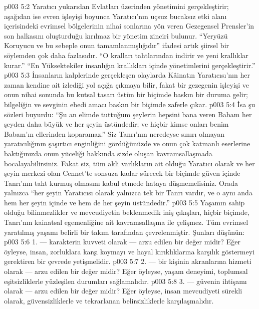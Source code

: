 \vs p003 5:2 Yaratıcı yukarıdan Evlatları üzerinden yönetimini gerçekleştirir; aşağıdan ise evren işleyişi boyunca Yaratıcı’nın uçsuz bucaksız etki alanı içerisindeki evrimsel bölgelerinin nihai sonlarına yön veren Gezegensel Prensler’in son halkasını oluşturduğu kırılmaz bir yönetim zinciri bulunur. “Yeryüzü Koruyucu ve bu sebeple onun tamamlanmışlığıdır” ifadesi artık şiirsel bir söylemden çok daha fazlasıdır. “O kralları tahtlarından indirir ve yeni krallıklar kurar.” “En Yüksektekiler insanlığın krallıkları içinde yönetimlerini gerçekleştirir.”
\vs p003 5:3 İnsanların kalplerinde gerçekleşen olaylarda Kâinatın Yaratıcısı’nın her zaman kendine ait izlediği yol açığa çıkmaya bilir, fakat bir gezegenin işleyişi ve onun nihai sonunda bu kutsal tasarı üstün bir biçimde baskın bir duruma gelir; bilgeliğin ve sevginin ebedi amacı baskın bir biçimde zaferle çıkar.
\vs p003 5:4 İsa şu sözleri buyurdu: “Şu an elimde tuttuğum şeylerin hepsini bana veren Babam her şeyden daha büyük ve her şeyin üstündedir; ve hiçbir kimse onları benim Babam’ın ellerinden koparamaz.” Siz Tanrı’nın neredeyse sınırı olmayan yaratıcılığının şaşırtıcı enginliğini gördüğünüzde ve onun çok katmanlı eserlerine baktığınızda onun yüceliği hakkında sizde oluşan kavramsallaşmada bocalayabilirsiniz. Fakat siz, tüm akli varlıkların ait olduğu Yaratıcı olarak ve her şeyin merkezi olan Cennet’te sonsuza kadar sürecek bir biçimde güven içinde Tanrı’nın taht kurmuş olmasını kabul etmede hataya düşmemelisiniz. Orada yalnızca “her şeyin Yaratıcısı olarak yalnızca tek bir Tanrı vardır, ve o aynı anda hem her şeyin içinde ve hem de her şeyin üstündedir.”
\vs p003 5:5 Yaşamın sahip olduğu bilinmezlikler ve mevcudiyetin beklenmedik iniş çıkışları, hiçbir biçimde, Tanrı’nın kainatsal egemenliğine ait kavramsallaşma ile çelişmez. Tüm evrimsel yaratılmış yaşamı belirli bir takım  tarafından çevrelenmiştir. Şunları düşünün:
\vs p003 5:6 1.\bibnobreakspace {} --- karakterin kuvveti olarak --- arzu edilen bir değer midir? Eğer öyleyse, insan, zorluklara karşı koymayı ve hayal kırıklıklarına karşılık göstermeyi gerektiren bir çevrede yetişmelidir.
\vs p003 5:7 2.\bibnobreakspace {} --- bir kişinin akranlarına hizmeti olarak --- arzu edilen bir değer midir? Eğer öyleyse, yaşam deneyimi, toplumsal eşitsizliklerle yüzleşilen durumları sağlamalıdır.
\vs p003 5:8 3.\bibnobreakspace {} --- güvenin ihtişamı olarak --- arzu edilen bir değer midir? Eğer öyleyse, insan mevcudiyeti sürekli olarak, güvensizliklerle ve tekrarlanan belirsizliklerle karşılaşmalıdır.
